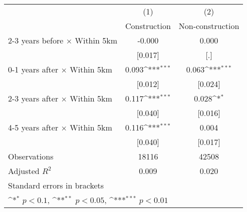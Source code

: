 {
\def\sym#1{\ifmmode^{#1}\else\(^{#1}\)\fi}
\begin{tabular}{l*{2}{c}}
\hline\hline
                    &\multicolumn{1}{c}{(1)}&\multicolumn{1}{c}{(2)}\\
                    &\multicolumn{1}{c}{Construction}&\multicolumn{1}{c}{Non-construction}\\
\hline
2-3 years before $\times$ Within 5km&      -0.000         &       0.000         \\
                    &     [0.017]         &         [.]         \\
0-1 years after $\times$ Within 5km&       0.093\sym{***}&       0.063\sym{***}\\
                    &     [0.012]         &     [0.024]         \\
2-3 years after $\times$ Within 5km&       0.117\sym{***}&       0.028\sym{*}  \\
                    &     [0.040]         &     [0.016]         \\
4-5 years after $\times$ Within 5km&       0.116\sym{***}&       0.004         \\
                    &     [0.040]         &     [0.017]         \\
\hline
Observations        &       18116         &       42508         \\
Adjusted \(R^{2}\)  &       0.009         &       0.020         \\
\hline\hline
\multicolumn{3}{l}{\footnotesize Standard errors in brackets}\\
\multicolumn{3}{l}{\footnotesize \sym{*} \(p<0.1\), \sym{**} \(p<0.05\), \sym{***} \(p<0.01\)}\\
\end{tabular}
}

